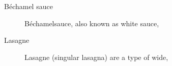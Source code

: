 \begin{description}
  \item [Béchamel sauce] Béchamelsauce, also known as white sauce, %
  \item [Lasagne] Lasagne (singular lasagna) are a type of wide, %
\end{description}


